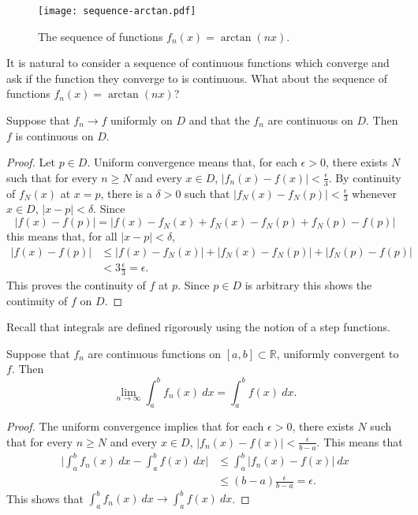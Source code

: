 \begin{figure}
  \begin{center}
    \texttt{[image: sequence-arctan.pdf]}
    \caption{The sequence of functions \(f_n(x)= \arctan(nx)\).}
  \end{center}
\end{figure}

It is natural to consider a sequence of continuous functions which converge and ask if the function they converge to is continuous.
What about the sequence of functions \(f_n(x) = \arctan (nx)\)?

\begin{theorem}
  \label{thm:continuous-limit}
  Suppose that \(f_n \to f\) uniformly on \(D\) and that the \(f_n\) are continuous on \(D\).
  Then \(f\) is continuous on \(D\).
\end{theorem}


\begin{proof}
  Let \(p\in D\).
  Uniform convergence means that, for each \(\epsilon>0\), there exists \(N\) such that for every \(n\geq N\) and every \(x\in D\), \(|f_n(x) - f(x)| < \frac{\epsilon}{3}\).
  By continuity of \(f_N(x)\) at \(x=p\), there is a \(\delta >0\) such that \(|f_N(x)-f_N(p)| < \frac{\epsilon}{3} \) whenever \(x\in D\), \(|x-p| <\delta\).
  Since
  \[
    | f(x) - f(p) | = |f(x) - f_N(x) + f_N(x) - f_N(p) + f_N(p) - f(p) | \]
  this means that, for all \(|x-p| <\delta\),
  \[
    \begin{aligned}
      | f(x) - f(p) | & \leq   |f(x) - f_N(x)| + |f_N(x) - f_N(p)| + |f_N(p) - f(p) | \\
                      & < 3 \frac{\epsilon}{3} = \epsilon.
    \end{aligned}
  \]
  This proves the continuity of \(f\) at \(p\). Since \(p\in D\) is arbitrary this shows the continuity of \(f\) on \(D\).
\end{proof}


Recall that integrals are defined rigorously using the notion of a step functions.

\begin{theorem}
  \label{thm:limit-of-integral}
  Suppose that \(f_n\) are continuous functions on \([a,b] \subset \mathbb{R}\), uniformly convergent to \(f\).
  Then
  \[
    \lim_{n\to \infty} \int_{a}^{b} f_n(x) \ dx = \int_{a}^{b} f(x) \ dx.
  \]
\end{theorem}

\begin{proof}
  The uniform convergence implies that for each \(\epsilon>0\), there exists \(N\) such that for every \(n\geq N\) and every \(x\in D\), \(|f_n(x) - f(x)| <  \frac{\epsilon}{b-a}\).
  This means that
  \[
    \begin{aligned}
      \Big| \int_{a}^{b} f_n(x) \ dx - \int_{a}^{b} f(x) \ dx \Big|
       & \leq \int_{a}^{b} | f_n(x) - f(x) | \ dx    \\
       & \leq (b-a) \frac{\epsilon}{b-a} = \epsilon.
    \end{aligned}
  \]
  This shows that \(\int_{a}^{b} f_n(x) \ dx \to  \int_{a}^{b} f(x) \ dx\).
\end{proof}


